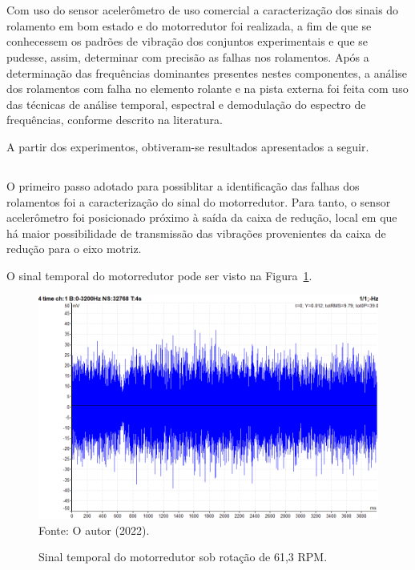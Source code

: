 \documentclass[
	12pt,				
	oneside,			
	a4paper,			
	english,			
	brazil,			
	]{abntex2ppgsi}
\begin{document}
\section{}

Com uso do sensor acelerômetro de uso comercial a caracterização dos sinais do rolamento em bom estado e do motorredutor foi realizada, a fim de que se conhecessem os padrões de vibração dos conjuntos experimentais e que se pudesse, assim, determinar com precisão as falhas nos rolamentos. Após a determinação das frequências dominantes presentes nestes componentes, a análise dos rolamentos com falha no elemento rolante e na pista externa foi feita com uso das técnicas de análise temporal, espectral e demodulação do espectro de frequências, conforme descrito na literatura.

A partir dos experimentos, obtiveram-se resultados apresentados a seguir.

\subsection{}

O primeiro passo adotado para possiblitar a identificação das falhas dos rolamentos foi a caracterização do sinal do motorredutor. Para tanto, o sensor acelerômetro foi posicionado próximo à saída da caixa de redução, local em que há maior possibilidade de transmissão das vibrações provenientes da caixa de redução para o eixo motriz.  

O sinal temporal do motorredutor pode ser visto na Figura~\ref{MOTORREDUTOR_TEMPORAL_ACELEROMETRO}.

\begin{figure}[H]
\centering
\caption {Sinal temporal do motorredutor sob rotação de 61,3 RPM.}
\includegraphics[width=\textwidth,keepaspectratio]{MOTORREDUTOR_TEMPORAL_ACELEROMETRO} \\
Fonte: O autor (2022).
\label{MOTORREDUTOR_TEMPORAL_ACELEROMETRO}
\end{figure}
\end{document}
